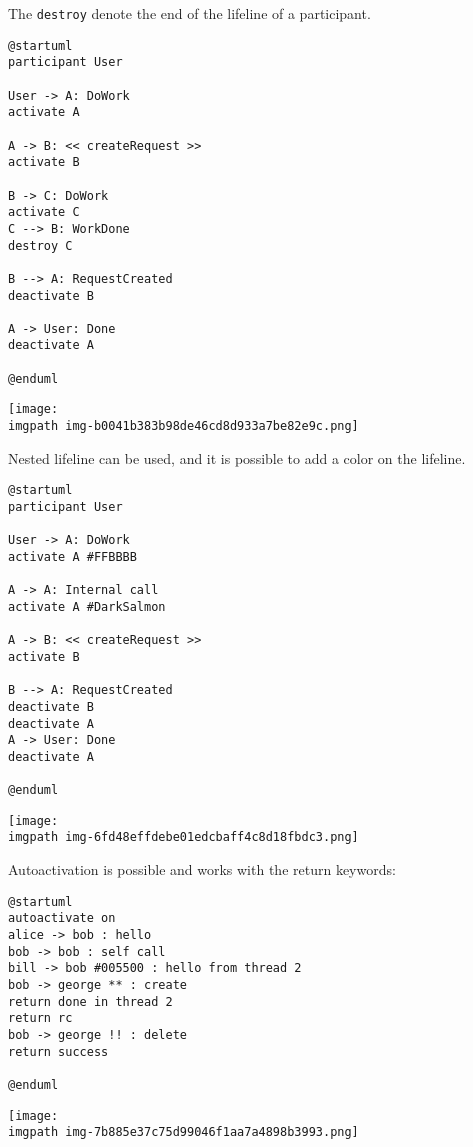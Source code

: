 The \texttt{destroy} denote the end of the lifeline of a
participant.


\begin{verbatim}
@startuml
participant User

User -> A: DoWork
activate A

A -> B: << createRequest >>
activate B

B -> C: DoWork
activate C
C --> B: WorkDone
destroy C

B --> A: RequestCreated
deactivate B

A -> User: Done
deactivate A

@enduml
\end{verbatim}
\begin{center}
\texttt{[image: \\imgpath img-b0041b383b98de46cd8d933a7be82e9c.png]}
\end{center}




Nested lifeline can be used, and it is possible to add a color on the lifeline.


\begin{verbatim}
@startuml
participant User

User -> A: DoWork
activate A #FFBBBB

A -> A: Internal call
activate A #DarkSalmon

A -> B: << createRequest >>
activate B

B --> A: RequestCreated
deactivate B
deactivate A
A -> User: Done
deactivate A

@enduml
\end{verbatim}
\begin{center}
\texttt{[image: \\imgpath img-6fd48effdebe01edcbaff4c8d18fbdc3.png]}
\end{center}


Autoactivation is possible and works with the return keywords:


\begin{verbatim}
@startuml
autoactivate on
alice -> bob : hello
bob -> bob : self call
bill -> bob #005500 : hello from thread 2
bob -> george ** : create
return done in thread 2
return rc
bob -> george !! : delete
return success

@enduml
\end{verbatim}
\begin{center}
\texttt{[image: \\imgpath img-7b885e37c75d99046f1aa7a4898b3993.png]}
\end{center}
%
%
